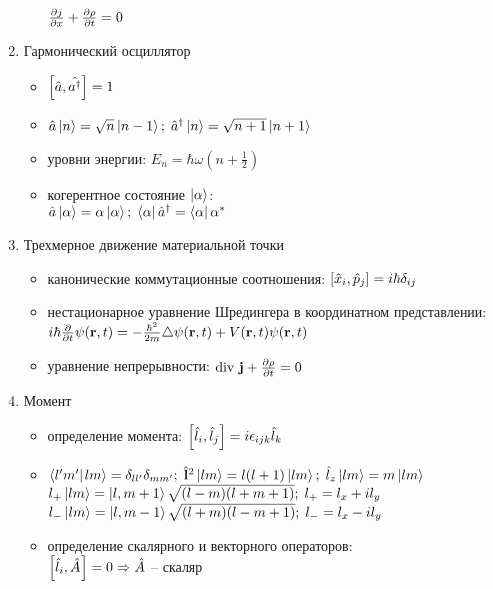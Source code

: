 \begin{enumerate}[label=\textbf{\underline{\arabic*.}}]
\begin{itemize}
            $ \frac{\partial j}{\partial x} + \frac{\partial \rho}{\partial t} = 0 $
        \end{itemize}
\item Гармонический осциллятор  \begin{itemize}
            \item
            $ \left[ \hat{a}, \hat{a^\dagger} \right] = 1 $
            \item
            $ \hat{a}\left| n \right> = \sqrt{n}\left| n-1 \right>;\; \hat{a}^\dagger\left| n \right> = \sqrt{n+1}\left| n+1 \right> $
            \item уровни энергии:
            $ E_n = \hbar\omega(n+\frac12) $
            \item когерентное состояние $\left| \alpha \right>$: \\
            $ \hat{a}\left| \alpha \right> = \alpha\left| \alpha \right>;\; \left< \alpha \right|\hat{a}^\dagger = \left< \alpha \right|\alpha^* $
        \end{itemize}
\item Трехмерное движение материальной точки  \begin{itemize}
            \item канонические коммутационные соотношения:
            $ \left[ \hat{x}_{i}, \hat{p}_{j} \right] = i\hbar\delta_{ij} $
            \item нестационарное уравнение Шредингера в координатном представлении: \\
            $ i\hbar \frac{\partial }{\partial t}\psi(\mathbf{r},t) = -\frac{\hbar^2}{2m}\triangle\psi(\mathbf{r},t)+V(\mathbf{r},t)\psi(\mathbf{r},t) $
            \item уравнение непрерывности:
            $ \text{div}\ \v{j} + \pd{\rho}{t} = 0 $
        \end{itemize}
\item Момент  \begin{itemize}
            \item определение момента:
            $ \left[ \hat{l}_{i}, \hat{l}_{j} \right] = i\epsilon_{ijk}\hat{l}_k $
            \item
            $ \braket{l'm'}{lm} = \delta_{ll'}\delta_{mm'};\; \hat{\v{l}}^2\ket{lm}=l(l+1)\ket{lm};\; \hat{l}_z\ket{lm}=m\ket{lm} $\\
            $ l_{+}\left| lm \right>=\left| l,m+1 \right>\sqrt{(l-m)(l+m+1)};\;l_{+}=l_x+il_y $\\
            $ l_{-}\left| lm \right>=\left| l,m-1 \right>\sqrt{(l+m)(l-m+1)};\;l_{-}=l_x-il_y$
            \item определение скалярного и векторного операторов: \\
            $ \left[ \hat{l}_{i}, \hat{A}_{} \right] = 0 \Rightarrow \hat{A} $ -- скаляр \\

\end{itemize}
\end{enumerate}
